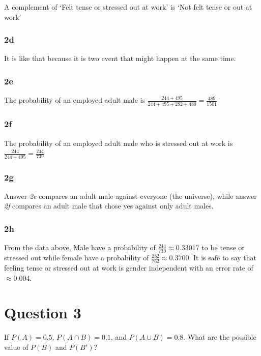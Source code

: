 \documentclass[
	11pt, %
]{assignment}
\begin{document}
A complement of `Felt tense or stressed out at work' is `Not felt tense or out at work'

\subsubsection*{2d}

It is like that because it is two event that might happen at the same time.

\subsubsection*{2e}

The probability of an employed adult male is \(\frac{244+495}{244+495+282+480} = \frac{489}{1501}\)

\subsubsection*{2f}

The probability of an employed adult male who is stressed out at work is \(\frac{244}{244+495} = \frac{244}{739}\)

\subsubsection*{2g}

Answer \textit{2e} compares an adult male against everyone (the universe), while answer \textit{2f} compares an adult male that chose yes against only adult males.

\subsubsection*{2h}

From the data above, Male have a probability of \( \frac{244}{739} \approx 0.33017\) to be tense or stressed out while female have a probability of \(\frac{282}{762} \approx 0.3700\). It is safe to say that feeling tense or stressed out at work is gender independent with an error rate of \(\approx 0.004\).

\section*{Question 3}
\begin{problem}
If \(P(A) = 0.5\), \(P(A\cap B) = 0.1 \), and \(P(A\cup B) = 0.8\). What are the possible value of \(P(B)\) and \(P(B')\)?
\end{problem}
\end{document}
